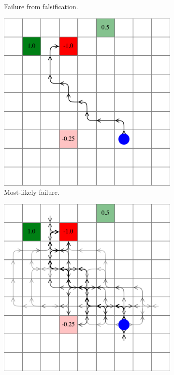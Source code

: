 \begin{figure}
\begin{subfigure}[b]{0.45\textwidth}
        \caption{Failure from falsification.}
        \label{fig:dof_falsification}
    \end{subfigure}
    \begin{subfigure}[b]{0.45\textwidth}
        \centering
        \includegraphics[width=\textwidth]{figures/distribution_over_failures/most_likely_failure.pdf}
        \caption{Most-likely failure.}
        \label{fig:dof_mostlikely_failure}
    \end{subfigure}
    \hfill
    \begin{subfigure}[b]{0.45\textwidth}
        \centering
        \includegraphics[width=\textwidth]{figures/distribution_over_failures/distribution_over_failures.pdf}

\end{subfigure}
\end{figure}
